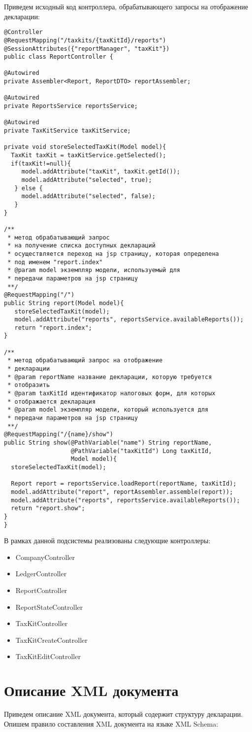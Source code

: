 \documentclass[14pt,a4paper]{reportmod}
\begin{document}
Приведем исходный код контроллера, обрабатывающего запросы на отображение декларации:
\begin{small}
\begin{verbatim}
@Controller
@RequestMapping("/taxkits/{taxKitId}/reports")
@SessionAttributes({"reportManager", "taxKit"})
public class ReportController {

@Autowired
private Assembler<Report, ReportDTO> reportAssembler;

@Autowired
private ReportsService reportsService;

@Autowired
private TaxKitService taxKitService;

private void storeSelectedTaxKit(Model model){
  TaxKit taxKit = taxKitService.getSelected();
  if(taxKit!=null){
     model.addAttribute("taxKit", taxKit.getId());
     model.addAttribute("selected", true);
   } else {
     model.addAttribute("selected", false);
   }
}

/**
 * метод обрабатывающий запрос
 * на получение списка доступных деклараций
 * осуществляется переход на jsp страницу, которая определена
 * под именем "report.index"
 * @param model экземпляр модели, используемый для
 * передачи параметров на jsp страницу
 **/
@RequestMapping("/")
public String report(Model model){
   storeSelectedTaxKit(model);
   model.addAttribute("reports", reportsService.availableReports());
   return "report.index";
}

/**
 * метод обрабатывающий запрос на отображение
 * декларации
 * @param reportName название декларации, которую требуется
 * отобразить
 * @param taxKitId идентификатор налоговых форм, для которых
 * отображается декларация
 * @param model экземпляр модели, который используется для
 * передачи параметров на jsp страницу
 **/
@RequestMapping("/{name}/show")
public String show(@PathVariable("name") String reportName,
                   @PathVariable("taxKitId") Long taxKitId,
                   Model model){
  storeSelectedTaxKit(model);

  Report report = reportsService.loadReport(reportName, taxKitId);
  model.addAttribute("report", reportAssembler.assemble(report));
  model.addAttribute("reports", reportsService.availableReports());
  return "report.show";
}
}
\end{verbatim}
\end{small}

В рамках данной подсистемы реализованы следующие контроллеры:
\begin{itemize}
  \item CompanyController
  \item LedgerController
  \item ReportController
  \item ReportStateController
  \item TaxKitController
  \item TaxKitCreateController
  \item TaxKitEditController
\end{itemize}


\section{Описание XML документа}

Приведем описание XML документа, который содержит структуру декларации. Опишем правило составления XML документа на языке XML Schema:


\end{document}
